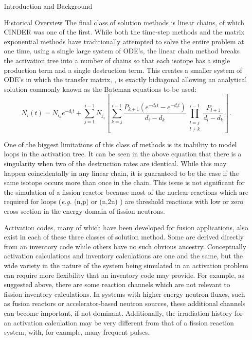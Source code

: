 \begin{chapter}{Introduction and Background}
\begin{section}{Historical Overview}
  The final class of solution methods is linear chains, of which
  CINDER\cite{CINDER} was one of the first.  While both the time-step
  methods and the matrix exponential methods have traditionally
  attempted to solve the entire problem at one time, using a single
  large system of ODE's, the linear chain method breaks the activation
  tree into a number of chains so that each isotope has a single
  production term and a single destruction term.  This creates a
  smaller system of ODE's in which the transfer matrix, , is
  exactly bidiagonal allowing an analytical solution commonly known as
  the Bateman equations\cite{Bateman} to be used:
  \begin{equation}
    \label{intro.bateman}
    N_i(t) = N_{i_o}e^{-d_i t} + \sum_{j=1}^{i-1}N_{j_o}\left [
      \sum_{k=j}^{i-1}\frac{P_{k+1}(e^{-d_k t} - e^{-d_i t})}{d_i -
        d_k}\prod_{\substack{l=j\\l\neq k}}^{i-1}\frac{P_{l+1}}{d_l-d_k}\right] \, .
  \end{equation}
  
  One of the biggest limitations of this class of methods is its
  inability to model loops in the activation tree.  It can be seen in
  the above equation that there is a singularity when two of the
  destruction rates are identical.  While this may happen
  coincidentally in any linear chain, it is guaranteed to be the case
  if the same isotope occurs more than once in the chain.  This issue
  is not significant for the simulation of a fission reactor because
  most of the nuclear reactions which are required for loops
  (\textsl{e.g.} (n,p) or (n,2n) ) are threshold reactions with low or
  zero cross-section in the energy domain of fission neutrons.
  
  Activation codes, many of which have been developed for fusion
  applications, also exist in each of these three classes of solution
  method.  Some are derived directly from an inventory code while
  others have no such obvious ancestry.  Conceptually activation
  calculations and inventory calculations are one and the same, but
  the wide variety in the nature of the system being simulated in an
  activation problem can require more flexibility that an inventory
  code may provide.  For example, as suggested above, there are some
  reaction channels which are not relevant to fission inventory
  calculations.  In systems with higher energy neutron fluxes, such as
  fusion reactors or accelerator-based neutron sources, these
  additional channels can become important, if not dominant.
  Additionally, the irradiation history for an activation calculation
  may be very different from that of a fission reaction system, with,
  for example, many frequent pulses.
  

\end{section}
\end{chapter}
